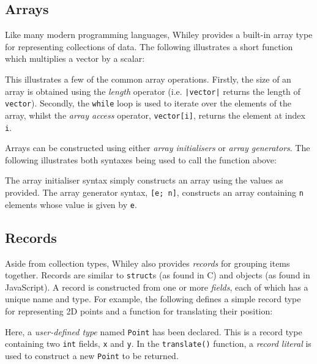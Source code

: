 \subsection{Arrays}
\label{walkthrough_collections}
Like many modern programming languages, Whiley provides a built-in array type for representing collections of data.  The following illustrates a short function which multiplies a vector by a scalar:



This illustrates a few of the common array operations.  Firstly, the size of an array is obtained using the {\em length} operator (i.e. \lstinline{|vector|} returns the length of \lstinline{vector}).  Secondly, the \lstinline{while} loop is used to iterate over the elements of the array, whilst the {\em array access} operator, \lstinline{vector[i]}, returns the element at index \lstinline{i}.  

Arrays can be constructed using either {\em array initialisers} or {\em array generators}.  The following illustrates both syntaxes being used to call the function above:



The array initialiser syntax simply constructs an array using the values as provided.  The array generator syntax, \lstinline{[e; n]}, constructs an array containing \lstinline{n} elements whose value is given by \lstinline{e}.
\subsection{Records}
Aside from collection types, Whiley also provides {\em records} for grouping items together.  Records are similar to \lstinline{struct}s (as found in C) and objects (as found in JavaScript).  A record is constructed from one or more {\em fields}, each of which has a unique name and type.  For example, the following defines a simple record type for representing 2D points and a function for translating their position:



Here, a {\em user-defined type} named \lstinline{Point} has been declared.  This is a record type containing two \lstinline{int} fields, \lstinline{x} and \lstinline{y}.  In the \lstinline{translate()} function, a {\em record literal} is used to construct a new \lstinline{Point} to be returned.

